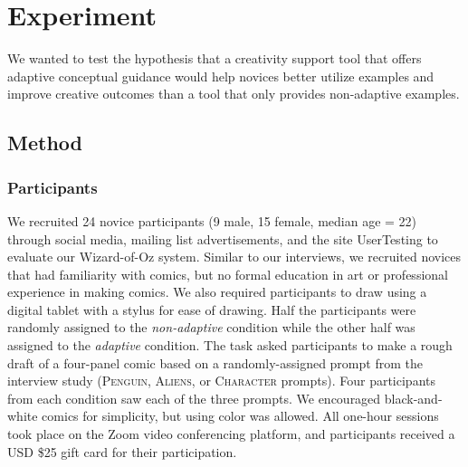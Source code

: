 \section{Experiment}
\label{sec:shown_exp}
We wanted to test the hypothesis that a creativity support tool that offers adaptive conceptual guidance would help novices better utilize examples and improve creative outcomes than a tool that only provides non-adaptive examples.

\subsection{Method}

\subsubsection{Participants}
We recruited 24 novice participants (9 male, 15 female, median age = 22) through social media, mailing list advertisements, and the site UserTesting to evaluate our Wizard-of-Oz system. Similar to our interviews, we recruited novices that had familiarity with comics, but no formal education in art or professional experience in making comics. We also required participants to draw using a digital tablet with a stylus for ease of drawing. Half the participants were randomly assigned to the \textit{non-adaptive} condition while the other half was assigned to the \textit{adaptive} condition. The task asked participants to make a rough draft of a four-panel comic based on a randomly-assigned prompt from the interview study (\textsc{Penguin}, \textsc{Aliens}, or \textsc{Character} prompts). Four participants from each condition saw each of the three prompts. We encouraged black-and-white comics for simplicity, but using color was allowed. All one-hour sessions took place on the Zoom video conferencing platform, and participants received a USD \$25 gift card for their participation. 

